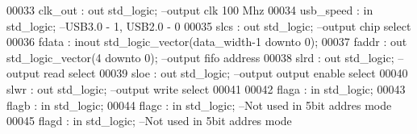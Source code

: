 \begin{DoxyCode}
00033         \textcolor{vhdlchar}{clk_out}             \textcolor{vhdlchar}{:} \textcolor{keywordflow}{out} \textcolor{comment}{std\_logic};\textcolor{keyword}{                                    --output clk 100 Mhz }
00034         \textcolor{vhdlchar}{usb_speed}               \textcolor{vhdlchar}{:} \textcolor{keywordflow}{in} \textcolor{comment}{std\_logic};\textcolor{keyword}{                                 --USB3.0 - 1, USB2.0 - 0}
00035         \textcolor{vhdlchar}{slcs}                    \textcolor{vhdlchar}{:} \textcolor{keywordflow}{out} \textcolor{comment}{std\_logic};\textcolor{keyword}{                                    --output chip select}
00036         \textcolor{vhdlchar}{fdata}                   \textcolor{vhdlchar}{:} \textcolor{keywordflow}{inout} \textcolor{comment}{std\_logic\_vector}\textcolor{vhdlchar}{(}\textcolor{vhdlchar}{data_width}\textcolor{vhdlchar}{-}\textcolor{vhdllogic}{}\textcolor{vhdllogic}{1} \textcolor{keywordflow}{downto} \textcolor{vhdllogic}{}\textcolor{vhdllogic}{0}\textcolor{vhdlchar}{)};         
00037         \textcolor{vhdlchar}{faddr}                   \textcolor{vhdlchar}{:} \textcolor{keywordflow}{out} \textcolor{comment}{std\_logic\_vector}\textcolor{vhdlchar}{(}\textcolor{vhdllogic}{}\textcolor{vhdllogic}{4} \textcolor{keywordflow}{downto} \textcolor{vhdllogic}{}\textcolor{vhdllogic}{0}\textcolor{vhdlchar}{)};\textcolor{keyword}{         --output fifo address}
00038         \textcolor{vhdlchar}{slrd}                    \textcolor{vhdlchar}{:} \textcolor{keywordflow}{out} \textcolor{comment}{std\_logic};\textcolor{keyword}{                                    --output read select}
00039         \textcolor{vhdlchar}{sloe}                    \textcolor{vhdlchar}{:} \textcolor{keywordflow}{out} \textcolor{comment}{std\_logic};\textcolor{keyword}{                                    --output output enable
       select}
00040         \textcolor{vhdlchar}{slwr}                    \textcolor{vhdlchar}{:} \textcolor{keywordflow}{out} \textcolor{comment}{std\_logic};\textcolor{keyword}{                                    --output write select}
00041                     
00042       flaga                 : \textcolor{keywordflow}{in} \textcolor{comment}{std\_logic};                                
00043         flagb                   : \textcolor{keywordflow}{in} \textcolor{comment}{std\_logic};
00044       flagc                 : \textcolor{keywordflow}{in} \textcolor{comment}{std\_logic};                                 --Not used \textcolor{keywordflow}{in} 5bit addres mode
00045       flagd                 : \textcolor{keywordflow}{in} \textcolor{comment}{std\_logic};                                 --Not used \textcolor{keywordflow}{in} 5bit addres mode

\end{DoxyCode}
